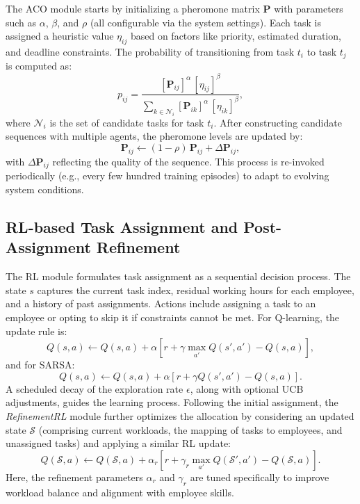 \documentclass[conference]{IEEEtran}
\begin{document}
	The ACO module starts by initializing a pheromone matrix $\mathbf{P}$ with parameters such as $\alpha$, $\beta$, and $\rho$ (all configurable via the system settings). Each task is assigned a heuristic value $\eta_{ij}$ based on factors like priority, estimated duration, and deadline constraints. The probability of transitioning from task $t_i$ to task $t_j$ is computed as:
	\[
	p_{ij} = \frac{[\mathbf{P}_{ij}]^{\alpha} \,[\eta_{ij}]^{\beta}}{\sum_{k \in \mathcal{N}_i}[\mathbf{P}_{ik}]^{\alpha} \,[\eta_{ik}]^{\beta}},
	\]
	where $\mathcal{N}_i$ is the set of candidate tasks for task $t_i$. After constructing candidate sequences with multiple agents, the pheromone levels are updated by:
	\[
	\mathbf{P}_{ij} \leftarrow (1 - \rho)\,\mathbf{P}_{ij} + \Delta \mathbf{P}_{ij},
	\]
	with $\Delta \mathbf{P}_{ij}$ reflecting the quality of the sequence. This process is re-invoked periodically (e.g., every few hundred training episodes) to adapt to evolving system conditions.
	
	\subsection{RL-based Task Assignment and Post-Assignment Refinement}
	
	The RL module formulates task assignment as a sequential decision process. The state $s$ captures the current task index, residual working hours for each employee, and a history of past assignments. Actions include assigning a task to an employee or opting to skip it if constraints cannot be met. For Q-learning, the update rule is:
	\begin{equation}
		Q(s,a) \leftarrow Q(s,a) + \alpha \left[r + \gamma \max_{a'} Q(s',a') - Q(s,a)\right],
	\end{equation}
	and for SARSA:
	\begin{equation}
		Q(s,a) \leftarrow Q(s,a) + \alpha \left[r + \gamma Q(s',a') - Q(s,a)\right].
	\end{equation}
	A scheduled decay of the exploration rate $\epsilon$, along with optional UCB adjustments, guides the learning process. Following the initial assignment, the \emph{RefinementRL} module further optimizes the allocation by considering an updated state $\mathcal{S}$ (comprising current workloads, the mapping of tasks to employees, and unassigned tasks) and applying a similar RL update:
	\[
	Q(\mathcal{S},a) \leftarrow Q(\mathcal{S},a) + \alpha_r \left[r + \gamma_r \max_{a'} Q(\mathcal{S}',a') - Q(\mathcal{S},a)\right].
	\]
	Here, the refinement parameters $\alpha_r$ and $\gamma_r$ are tuned specifically to improve workload balance and alignment with employee skills.
	
\end{document}
